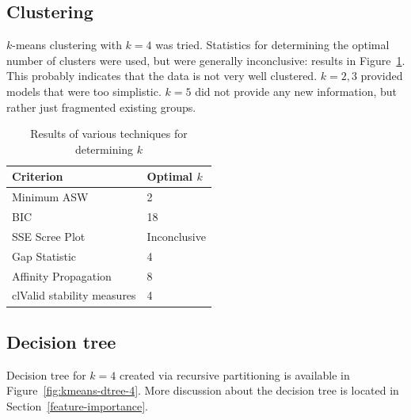 \documentclass[10pt]{article}
\begin{document}
\begin{multicols}{2}
\section{Clustering}

$k$-means clustering with $k = 4$ was tried. Statistics for determining the
optimal number of clusters were used, but were generally inconclusive: results in
Figure~\ref{tab:numclus}. This probably indicates that the data is not very
well clustered. $k = 2, 3$ provided models that were too simplistic. $k = 5$
did not provide any new information, but rather just fragmented existing
groups.
\begin{table}[H]
  \centering
  \begin{tabular}{l|l}
    Criterion & Optimal $k$ \\
    \hline
    Minimum ASW & 2 \\
    BIC & 18 \\
    SSE Scree Plot & Inconclusive \\
    Gap Statistic & 4 \\
    Affinity Propagation & 8 \\%
    clValid stability measures & 4 \\
  \end{tabular}
  \caption{Results of various techniques for determining $k$}
  \label{tab:numclus}
\end{table}

\subsection{Decision tree}

Decision tree for $k = 4$ created via recursive partitioning is available in
Figure~\ref{fig:kmeans-dtree-4}. More discussion about the decision tree is
located in Section~\ref{feature-importance}.


\end{multicols}
\end{document}

